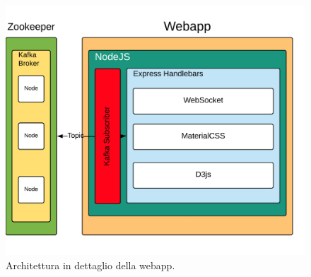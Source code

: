 \begin{figure}[H]
	\centering
	\includegraphics[width=\textwidth, height=0.25\textheight, keepaspectratio]{images/webApp.png}
	\caption{Architettura in dettaglio della webapp.}
	\label{fig:webAppArchitetture}
\end{figure}